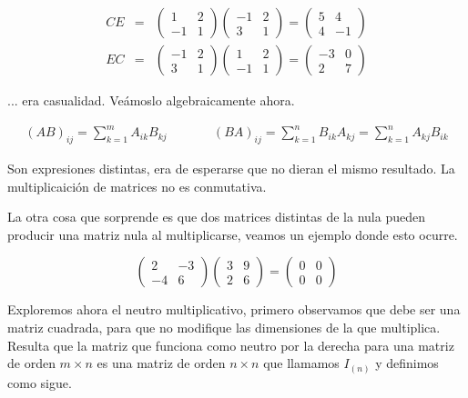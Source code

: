 \documentclass[12pt]{book}
\begin{document}
\begin{eqnarray*}
  CE&=&\left(\begin{array}{cc} 1 & 2\\ -1 & 1\end{array}\right)
    \left(\begin{array}{cc} -1 & 2\\ 3 & 1\end{array}\right)=
    \left(\begin{array}{cc} 5 & 4\\ 4 & -1\end{array}\right)\\
  EC&=&\left(\begin{array}{cc} -1 & 2\\ 3 & 1\end{array}\right)
    \left(\begin{array}{cc} 1 & 2\\ -1 & 1\end{array}\right)=
    \left(\begin{array}{cc} -3 & 0\\ 2 & 7\end{array}\right)
\end{eqnarray*}

... era casualidad. Veámoslo algebraicamente ahora.

\begin{eqnarray*}
  (AB)_{ij}= \sum_{k=1}^m A_{ik}B_{kj}&\qquad&
  (BA)_{ij}= \sum_{k=1}^n B_{ik}A_{kj}=\sum_{k=1}^n A_{kj}B_{ik}
\end{eqnarray*}

Son expresiones distintas, era de esperarse que no dieran el mismo resultado.
La multiplicaición de matrices no es conmutativa.

La otra cosa que sorprende es que dos matrices distintas de la nula pueden producir una matriz nula al multiplicarse, veamos un ejemplo donde esto ocurre.

$$\left(\begin{array}{cc} 2 & -3\\ -4 & 6\end{array}\right)
  \left(\begin{array}{cc} 3 & 9\\ 2 & 6\end{array}\right)=
  \left(\begin{array}{cc} 0 & 0\\ 0 & 0\end{array}\right)$$


Exploremos ahora el neutro multiplicativo, primero observamos que debe ser una matriz cuadrada, para que no modifique las dimensiones de la que multiplica.
Resulta que la matriz que funciona como neutro por la derecha para una matriz de orden $m\times n$ es una matriz de orden $n\times n$ que llamamos $I_{(n)}$ y definimos como sigue.
\end{document}
